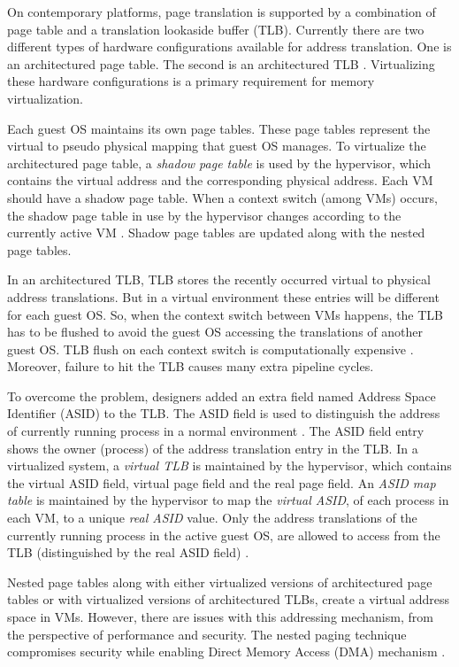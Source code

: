 \documentclass[a4paper,10pt,twocolumn]{article}
\begin{document}
  On contemporary platforms, page translation is supported by a combination of page table and a translation lookaside buffer (TLB). Currently there are two different types of hardware configurations available for address translation. One is  an architectured page table. The second is an architectured TLB \cite{Smith2006}. Virtualizing these hardware configurations is a primary requirement for memory virtualization.

  Each guest OS maintains its own page tables. These page tables represent the virtual to pseudo physical mapping that guest OS manages. To virtualize the architectured page table, a \textit{shadow page table} \cite{Smith2006} is used by the hypervisor, which contains the virtual address and the corresponding physical address. Each VM should have a shadow page table. When a context switch (among VMs) occurs, the shadow page table in use by the hypervisor changes according to the currently active VM \cite{Smith2006}. Shadow page tables are updated along with the nested page tables.

  In an architectured TLB, TLB stores the recently occurred virtual to physical address translations. But in a virtual environment these entries will be different for each guest OS. So, when the context switch between VMs happens, the TLB has to be flushed to avoid the guest OS accessing the translations of another guest OS. TLB flush on each context switch is computationally expensive \cite{Smith2006} \cite{tai2013comparisons}. Moreover, failure to hit the TLB causes many extra pipeline cycles.

  To overcome the problem, designers added an extra field named Address Space Identifier (ASID) to the TLB. The ASID field is used to distinguish the address of currently running process in a normal environment \cite{Smith2006}. The ASID field entry shows the owner (process) of the address translation entry in the TLB. In a virtualized system, a \textit{virtual TLB} is maintained by the hypervisor, which contains the virtual ASID field, virtual page field and the real page field. An \textit{ASID map table} is maintained by the hypervisor to map the \textit{virtual ASID}, of each process in each VM, to a unique \textit{real ASID} value. Only the address translations of the currently running process in the active guest OS, are allowed to access from the TLB (distinguished by the real ASID field) \cite{Smith2006}.

  Nested page tables along with either virtualized versions of architectured page tables or with virtualized versions of architectured TLBs, create a virtual address space in VMs. However, there are  issues with this addressing mechanism, from the perspective of performance and security. The nested paging technique compromises security while enabling Direct Memory Access (DMA) mechanism  \cite{Smith2006} \cite{DarrenAbramson2006} .
\end{document}

